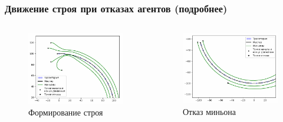 \documentclass[10pt]{beamer}
\begin{document}
\begin{frame}
	\frametitle{Движение строя при отказах агентов (подробнее)}
	\begin{columns}
		\begin{figure}
			\centering
			\includegraphics[width=1\linewidth]{platoon/with-crashes-zoom2}
			\caption{Формирование строя}
			\label{fig:with-crashes-zoom2}
		\end{figure}
		\begin{figure}
			\centering
			\includegraphics[width=1\linewidth]{platoon/with-crashes-zoom1}
			\caption{Отказ миньона}
			\label{fig:with-crashes-zoom1}
		\end{figure}
	\end{columns}
\end{frame}
\end{document}
